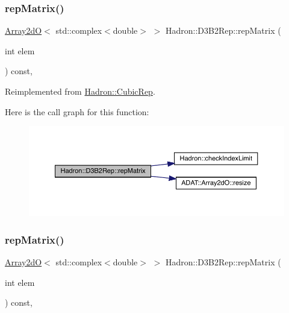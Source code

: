 \subsubsection{\texorpdfstring{repMatrix()}{repMatrix()}\hspace{0.1cm}{\footnotesize\ttfamily [1/2]}}
{\footnotesize\ttfamily \mbox{\hyperlink{classADAT_1_1Array2dO}{Array2dO}}$<$ std\+::complex$<$double$>$ $>$ Hadron\+::\+D3\+B2\+Rep\+::rep\+Matrix (\begin{DoxyParamCaption}\item[{int}]{elem }\end{DoxyParamCaption}) const\hspace{0.3cm}{\ttfamily [inline]}, {\ttfamily [virtual]}}



Reimplemented from \mbox{\hyperlink{structHadron_1_1CubicRep_ac5d7e9e6f4ab1158b5fce3e4ad9e8005}{Hadron\+::\+Cubic\+Rep}}.

Here is the call graph for this function\+:
\nopagebreak
\begin{figure}[H]
\begin{center}
\leavevmode
\includegraphics[width=350pt]{d3/d61/structHadron_1_1D3B2Rep_a3e946b6e27ca026d8e7b1bcd02471deb_cgraph}
\end{center}
\end{figure}
\mbox{\label{structHadron_1_1D3B2Rep_a3e946b6e27ca026d8e7b1bcd02471deb}} 
\subsubsection{\texorpdfstring{repMatrix()}{repMatrix()}\hspace{0.1cm}{\footnotesize\ttfamily [2/2]}}
{\footnotesize\ttfamily \mbox{\hyperlink{classADAT_1_1Array2dO}{Array2dO}}$<$ std\+::complex$<$double$>$ $>$ Hadron\+::\+D3\+B2\+Rep\+::rep\+Matrix (\begin{DoxyParamCaption}\item[{int}]{elem }\end{DoxyParamCaption}) const\hspace{0.3cm}{\ttfamily [inline]}, {\ttfamily [virtual]}}



